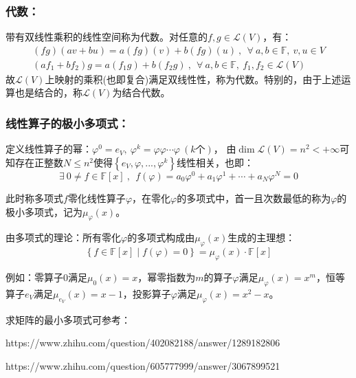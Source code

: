 \documentclass[zihao=-4,UTF8]{report}
\theoremstyle{mystyle} %
\begin{document}
\subsubsection{代数：}
带有双线性乘积的线性空间称为代数。对任意的$ f,g \in \mathscr{L}(V)$，有：
\begin{gather*}
    (fg)(av + bu) = a(fg)(v) + b(fg)(u)\ ,\ \  \forall\  a,b \in \mathbb{F},\ v,u \in V\\
    (af_1 + bf_2)g = a(f_1g) + b(f_2g)\ ,\ \  \forall\  a,b \in \mathbb{F},\ f_1,f_2 \in  \mathscr{L}(V)
\end{gather*}
故$\mathscr{L}(V)$上映射的乘积(也即复合)满足双线性性，称为代数。特别的，由于上述运算也是结合的，称$\mathscr{L}(V)$为结合代数。

\subsubsection{线性算子的极小多项式：}
定义线性算子的幂：$\varphi^0 = e_V,\ \varphi^k = \varphi \varphi\cdots \varphi\ (k\text{个})$，
由$\dim \mathscr{L}(V) = n^2 < +\infty$可知存在正整数$N \le n^2 $使得$\left\{e_V, \varphi, ..., \varphi^k\right\}$线性相关，也即：
\begin{equation*}
    \exists\  0 \ne f\in \mathbb{F}[x]\ ,\  \ f(\varphi) = a_0\varphi^0 + a_1\varphi^1 + \cdots + a_N\varphi^N = 0
\end{equation*}\par
此时称多项式$f$零化线性算子$\varphi$，在零化$\varphi$的多项式中，首一且次数最低的称为$\varphi$的极小多项式，记为$\mu _{\varphi}(x)$。\par
由多项式的理论：所有零化$\varphi$的多项式构成由$\mu_{\varphi}(x)$生成的主理想：
\begin{equation*}
    \left\{f \in \mathbb{F}[x] \mid f(\varphi) = 0\right\} =\mu_{\varphi}(x) \cdot  \mathbb{F}[x]
\end{equation*}
\par
{\color{gray}\small 例如：零算子0满足$\mu_{\text{0}}(x) = x $，幂零指数为$m$的算子$\varphi$满足$\mu_{\varphi}(x) = x^m $，恒等算子$e_V$满足$\mu_{e_V}(x) = x-1$，投影算子$\varphi$满足$\mu_{\varphi}(x) = x^2 -x$。\par
求矩阵的最小多项式可参考：\par
https://www.zhihu.com/question/402082188/answer/1289182806 \par
https://www.zhihu.com/question/605777999/answer/3067899521
}
\end{document}
